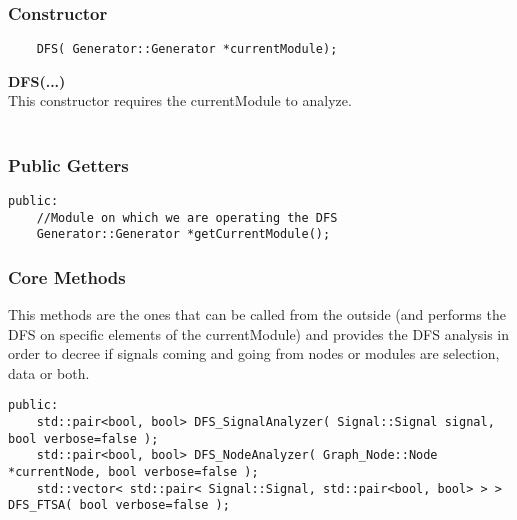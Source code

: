 \documentclass{article}
\begin{document}
\subsubsection{Constructor}

\begin{mdframed}[hidealllines=true, backgroundcolor=magenta!10]
	\begin{lstlisting}
	DFS( Generator::Generator *currentModule);
	\end{lstlisting}
\end{mdframed}

\textbf{DFS(...)}\\
This constructor requires the currentModule to analyze.\\\\

\subsubsection{Public Getters}

\begin{mdframed}[hidealllines=true, backgroundcolor=magenta!10]
	\begin{lstlisting}
public:
	//Module on which we are operating the DFS
	Generator::Generator *getCurrentModule();
	\end{lstlisting}
\end{mdframed}

\subsubsection{Core Methods}

This methods are the ones that can be called from the outside (and performs the DFS on specific elements of the currentModule) and provides the DFS analysis in 
order to decree if signals coming and going from nodes or modules are selection, data or both.\\

\begin{mdframed}[hidealllines=true, backgroundcolor=magenta!10]
	\begin{lstlisting}[basicstyle=\tiny]
public:
	std::pair<bool, bool> DFS_SignalAnalyzer( Signal::Signal signal, bool verbose=false );
	std::pair<bool, bool> DFS_NodeAnalyzer( Graph_Node::Node *currentNode, bool verbose=false );
	std::vector< std::pair< Signal::Signal, std::pair<bool, bool> > > DFS_FTSA( bool verbose=false );
	\end{lstlisting}
\end{mdframed}
\end{document}
